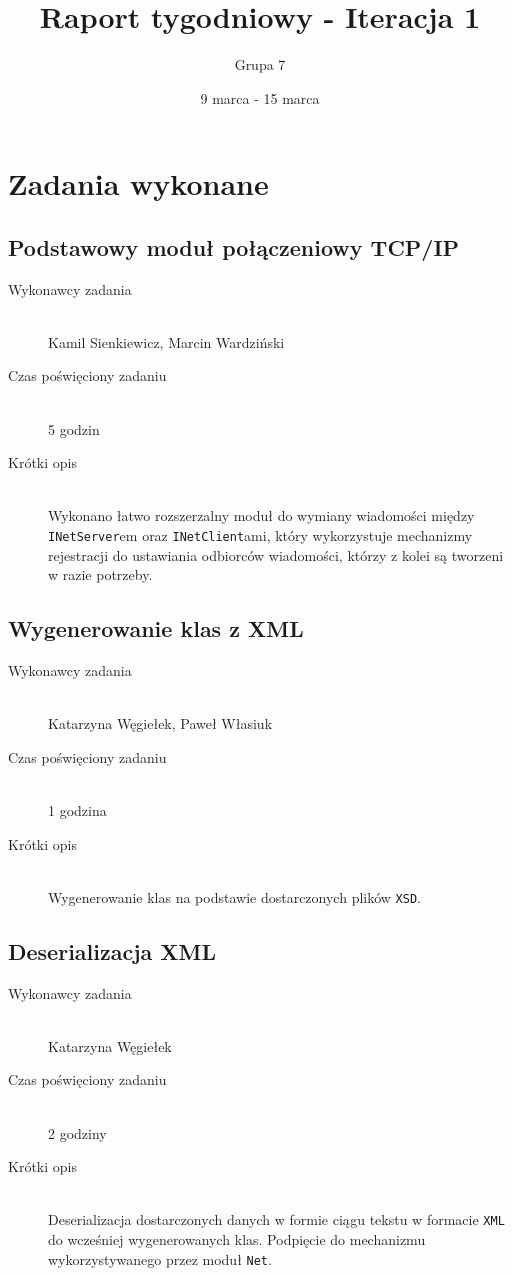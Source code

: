 \documentclass[a4paper]{article}
\title{Raport tygodniowy - Iteracja 1}
\date{9 marca - 15 marca}
\author{Grupa 7}
\begin{document}
\maketitle

\section{Zadania wykonane}
\subsection{Podstawowy moduł połączeniowy TCP/IP}
\begin{description}
    \item[Wykonawcy zadania] \hfill \\ Kamil Sienkiewicz, Marcin Wardziński
    \item[Czas poświęciony zadaniu] \hfill \\ 5 godzin
    \item[Krótki opis] \hfill \\
        Wykonano łatwo rozszerzalny moduł do wymiany wiadomości między \texttt{INetServer}em oraz \texttt{INetClient}ami, który wykorzystuje mechanizmy rejestracji do ustawiania odbiorców wiadomości, którzy z kolei są tworzeni w razie potrzeby.
        
\end{description}

\subsection{Wygenerowanie klas z XML}
\begin{description}
    \item[Wykonawcy zadania] \hfill \\ Katarzyna Węgiełek, Paweł Własiuk
    \item[Czas poświęciony zadaniu] \hfill \\ 1 godzina
    \item[Krótki opis] \hfill \\ Wygenerowanie klas na podstawie dostarczonych plików \texttt{XSD}. 
\end{description}

\subsection{Deserializacja XML}
\begin{description}
    \item[Wykonawcy zadania] \hfill \\ Katarzyna Węgiełek
    \item[Czas poświęciony zadaniu] \hfill \\ 2 godziny
    \item[Krótki opis] \hfill \\ Deserializacja dostarczonych danych w formie ciągu tekstu w formacie \texttt{XML} do wcześniej wygenerowanych klas. Podpięcie do mechanizmu wykorzystywanego przez moduł \texttt{Net}.
\end{description}
   
\end{document}

